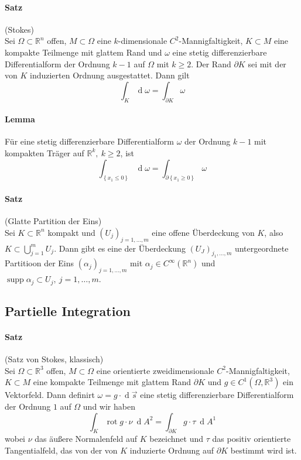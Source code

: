 \documentclass[12pt,a4paper,fleqn]{article}
\def\set#1{{\left\{ #1 \right\}}}
\def\R{{\mathbb{R}}}
\def\d{{\operatorname{d}}}
\begin{document}
\paragraph{Satz} (Stokes)\\
Sei $\Omega\subset\R^n$ offen, $M\subset\Omega$ eine $k$-dimensionale $C^2$-Mannigfaltigkeit, $K\subset M$ eine kompakte Teilmenge mit glattem Rand und $\omega$ eine stetig differenzierbare Differentialform der Ordnung $k-1$ auf $\Omega$ mit $k\geq 2$. Der Rand $\partial K$ sei mit der von $K$ induzierten Ordnung ausgestattet. Dann gilt
\begin{displaymath}
\int_K \d\omega = \int_{\partial K} \omega
\end{displaymath}

\paragraph{Lemma} Für eine stetig differenzierbare Differentialform $\omega$ der Ordnung $k-1$ mit kompakten Träger auf $\R^k,\ k\geq 2$, ist 
\begin{displaymath}
\int_{\set{x_1\leq 0}} \d \omega = \int_{\partial \set{x_1 \geq 0}} \omega
\end{displaymath}

\paragraph{Satz} (Glatte Partition der Eins)\\
Sei $K\subset \R^n$ kompakt und $(U_j)_{j=1, \dots, m}$ eine offene Überdeckung von $K$, also ${K\subset\bigcup_{j=1}^m U_j}$. Dann gibt es eine der Überdeckung $(U_J)_{j_1, \dots, m}$ untergeordnete Partitioon der Eins $(\alpha_j)_{j=1, \dots, m}$ mit $\alpha_j \in C^\infty(\R^n)$ und $\operatorname{supp} \alpha_j \subset U_j,\ j=1, \dots, m$.

\subsection{Partielle Integration}

\paragraph{Satz} (Satz von Stokes, klassisch)\\
Sei $\Omega\subset\R^3$ offen, $M\subset \Omega$ eine orientierte zweidimensionale $C^2$-Mannigfaltigkeit, $K\subset M$ eine kompakte Teilmenge mit glattem Rand $\partial K$ und $g\in C^1(\Omega, \R^3)$ ein Vektorfeld. Dann definirt $\omega=g\cdot\d \overrightarrow{s}$ eine stetig differenzierbare Differentialform der Ordnung $1$ auf $\Omega$ und wir haben
\begin{displaymath}
\int_K \operatorname{rot} g \cdot \nu\ \d A^2 = \int_{\partial K} g \cdot \tau\ \d A^1
\end{displaymath}
wobei $\nu$ das äußere Normalenfeld auf $K$ bezeichnet und $\tau$ das positiv orientierte Tangentialfeld, das von der von $K$ induzierte Ordnung auf $\partial K$ bestimmt wird ist.
\end{document}
